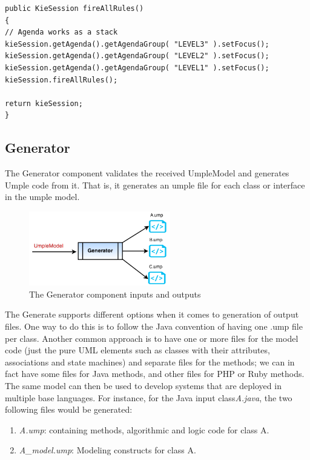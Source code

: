 \begin{lstlisting}[style=java, caption=Firing the rules in the Umplificator, label=lst:fireAllRules]
public KieSession fireAllRules()
{
// Agenda works as a stack
kieSession.getAgenda().getAgendaGroup( "LEVEL3" ).setFocus();
kieSession.getAgenda().getAgendaGroup( "LEVEL2" ).setFocus();
kieSession.getAgenda().getAgendaGroup( "LEVEL1" ).setFocus();
kieSession.fireAllRules();

return kieSession;
}
\end{lstlisting}

\subsection{Generator}

The Generator component validates the received UmpleModel and generates Umple code from it. That is, it generates an umple file for each class or interface in the umple model.

\begin{figure}[h]
\centering
\includegraphics[width=0.55\textwidth]{Figures/generatorINOut.png}
\caption{The Generator component inputs and outputs}
\label{fig:generatorInOut}
\end{figure}

The Generate supports different options when it comes to generation of output files.  One way to do this is to follow the Java convention of having one .ump file per class. Another common approach is to have one or more files for the model code (just the pure UML elements such as classes with their attributes, associations and state machines) and separate files for the methods; we can in fact have some files for Java methods, and other files for PHP or Ruby methods. The same model can then be used to develop systems that are deployed in multiple base languages. For instance, for the Java  input class\textit{A.java}, the two following files would be generated:

\begin{enumerate}
\item \textit{A.ump}: containing methods, algorithmic and logic code for class A.
\item \textit{A\_model.ump}: Modeling constructs for class A.
\end{enumerate}

